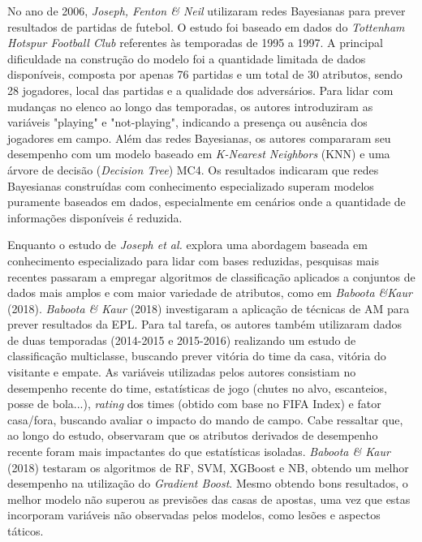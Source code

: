 No ano de 2006, \textit{Joseph, Fenton \& Neil} utilizaram redes Bayesianas para prever resultados de partidas de futebol. 
O estudo foi baseado em dados do \textit{Tottenham Hotspur Football Club} referentes às temporadas de 1995 a 1997. 
A principal dificuldade na construção do modelo foi a quantidade limitada de dados disponíveis, composta por apenas 76 partidas e um total de 30 atributos, 
sendo 28 jogadores, local das partidas e a qualidade dos adversários.
Para lidar com mudanças no elenco ao longo das temporadas, os autores introduziram as variáveis "playing" e "not-playing", 
indicando a presença ou ausência dos jogadores em campo. Além das redes Bayesianas, os autores compararam seu desempenho com um modelo baseado em 
\textit{K-Nearest Neighbors} (KNN) e uma árvore de decisão (\textit{Decision Tree}) MC4. 
Os resultados indicaram que redes Bayesianas construídas com conhecimento especializado superam modelos puramente baseados em dados, 
especialmente em cenários onde a quantidade de informações disponíveis é reduzida. 

Enquanto o estudo de \textit{Joseph et al.} explora uma abordagem baseada em conhecimento especializado para lidar com bases reduzidas, pesquisas mais recentes 
passaram a empregar algoritmos de classificação aplicados a conjuntos de dados mais amplos e com maior variedade de atributos, como em \textit{Baboota \&Kaur} (2018).
\textit{Baboota \& Kaur} (2018) investigaram a aplicação de técnicas de AM para prever resultados da EPL. 
Para tal tarefa, os autores também utilizaram dados de duas temporadas (2014-2015 e 2015-2016) realizando um estudo de classificação multiclasse, 
buscando prever vitória do time da casa, vitória do visitante e empate.
As variáveis utilizadas pelos autores consistiam no desempenho recente do time, estatísticas de jogo (chutes no alvo, escanteios, posse de bola...), 
\textit{rating} dos times (obtido com base no FIFA Index) e fator casa/fora, buscando avaliar o impacto do mando de campo. 
Cabe ressaltar que, ao longo do estudo, observaram que os atributos derivados de desempenho recente foram mais impactantes do que estatísticas isoladas.
\textit{Baboota \& Kaur} (2018) testaram os algoritmos de RF, SVM, XGBoost e NB, obtendo um melhor desempenho na utilização do \textit{Gradient Boost}. 
Mesmo obtendo bons resultados, o melhor modelo não superou as previsões das casas de apostas, uma vez que estas incorporam variáveis não observadas pelos 
modelos, como lesões e aspectos táticos.

